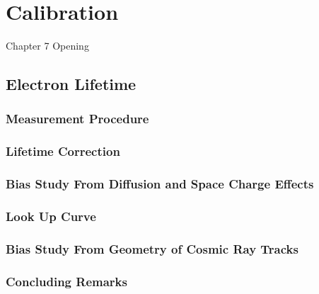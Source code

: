 
\chapter{Calibration}

\ifpdf
    \graphicspath{{Chapter7/Figs/Raster/}{Chapter7/Figs/PDF/}{Chapter7/Figs/}}
\else
    \graphicspath{{Chapter7/Figs/Vector/}{Chapter7/Figs/}}
\fi


Chapter 7 Opening

\newpage

\section{Electron Lifetime}

\subsection{Measurement Procedure}

\subsection{Lifetime Correction}

\subsection{Bias Study From Diffusion and Space Charge Effects}

\subsection{Look Up Curve}

\subsection{Bias Study From Geometry of Cosmic Ray Tracks}

\subsection{Concluding Remarks}

